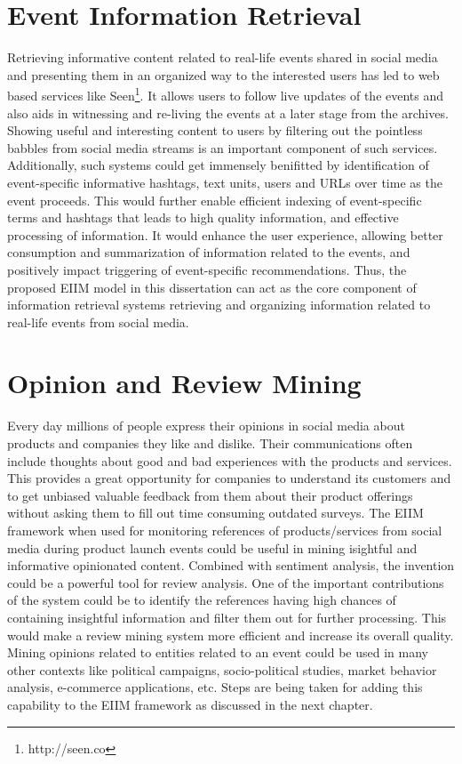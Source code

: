 \section{Event Information Retrieval}
Retrieving informative content related to real-life events shared in social media and presenting them in an organized way to the interested users has led to web based services like Seen\footnote{http://seen.co}. It allows users to follow live updates of the events and also aids in witnessing and re-living the events at a later stage from the archives. Showing useful and interesting content to users by filtering out the pointless babbles from social media streams is an important component of such services. Additionally, such systems could get immensely benifitted by identification of event-specific informative hashtags, text units, users and URLs over time as the event proceeds. This would further enable efficient indexing of event-specific terms and hashtags that leads to high quality information, and effective processing of information. It would enhance the user experience, allowing better consumption and summarization of information related to the events, and positively impact triggering of event-specific recommendations. Thus, the proposed EIIM model in this dissertation can act as the core component of information retrieval systems retrieving and organizing information related to real-life events from social media. 

\section{Opinion and Review Mining}
Every day millions of people express their opinions in social media about products and companies they like and dislike. Their communications often include thoughts about good and bad experiences with the products and services. This provides a great opportunity for companies to understand its customers and to get unbiased valuable feedback from them about their product offerings without asking them to fill out time consuming outdated surveys. The EIIM framework when used for monitoring references of products/services from social media during product launch events could be useful in mining isightful and informative opinionated content. Combined with sentiment analysis, the invention could be a powerful tool for review analysis. One of the important contributions of the system could be to identify the references having high chances of containing insightful information and filter them out for further processing. This would make a review mining system more efficient and increase its overall quality. Mining opinions related to entities related to an event could be used in many other contexts like political campaigns, socio-political studies, market behavior analysis, e-commerce applications, etc. Steps are being taken for adding this capability to the EIIM framework as discussed in the next chapter. 

